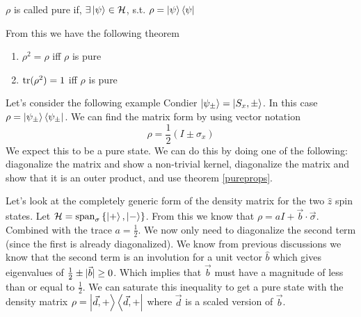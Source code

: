 \begin{definition}
\label{purestate2}
$\rho$ is called pure if, $\exists \Ket{\psi} \in \mathcal{H}$, s.t.
$\rho = \Ket{\psi}\Bra{\psi}$
\end{definition}

From this we have the following theorem
\begin{theorem}
\label{pureprops}
\begin{enumerate}
    \item $\rho^2 = \rho$ iff $\rho$ is pure
    \item $\operatorname{tr}(\rho^2) = 1$ iff $\rho$ is pure
\end{enumerate}
\end{theorem}

Let's consider the following example
Condier $\Ket{\psi_\pm} = \Ket{S_x,\pm}$. In this case $\rho = \Ket{\psi_\pm}\Bra{\psi_\pm}$.
We can find the matrix form by using vector notation
$$
    \rho = \frac{1}{2} \left(I \pm \sigma_x\right)
$$
We expect this to be a pure state. We can do this by doing one of the following:
diagonalize the matrix and show a non-trivial kernel, diagonalize the matrix and show that
it is an outer product, and use theorem \ref{pureprops}.

Let's look at the completely generic form of the density matrix for the two $\hat{z}$ spin
states. Let $\mathcal{H} = \text{span}_{\sigma} \left\{\Ket{+}, \Ket{-}\right\}$. From this
we know that $\rho = a I + \vec{b} \cdot \vec{\sigma}$. Combined with the trace
$a = \frac{1}{2}$. We now only need to diagonalize the second term (since the first
is already diagonalized). We know from previous discussions we know that the second
term is an involution for a unit vector $\hat{b}$ which gives eigenvalues of
$\frac{1}{2} \pm \lvert\vec{b}\rvert \ge 0$. Which implies that $\vec{b}$ must have
a magnitude of less than or equal to $\frac{1}{2}$. We can saturate this
inequality to get a pure state with the density matrix
$\rho = \Ket{\vec{d},+}\Bra{\vec{d},+}$ where $\vec{d}$ is a scaled version of $\vec{b}$.

